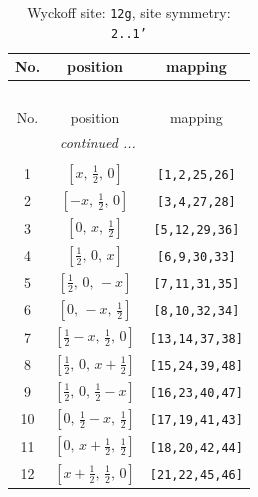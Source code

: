 \documentclass[fleqn,8pt]{jsarticle}
\begin{document}
\begin{longtable}{ccc}
\caption{Wyckoff site: {\tt 12g}, site symmetry: {\tt 2..1'}}
 \\
 \hline \hline
No. & position & mapping \\ \hline \endfirsthead

\multicolumn{2}{l}{\tablename\ \thetable{}} \\
 \hline \hline
No. & position & mapping \\ \hline \endhead

 \hline \hline
\multicolumn{2}{r}{\footnotesize\it continued ...} \\ \endfoot

 \hline \hline
\multicolumn{2}{r}{} \\ \endlastfoot

1 & $\left[ x,\, \frac{1}{2},\, 0 \right]$ & {\tt [1,2,25,26]} \\ \hline
2 & $\left[ - x,\, \frac{1}{2},\, 0 \right]$ & {\tt [3,4,27,28]} \\ \hline
3 & $\left[ 0,\, x,\, \frac{1}{2} \right]$ & {\tt [5,12,29,36]} \\ \hline
4 & $\left[ \frac{1}{2},\, 0,\, x \right]$ & {\tt [6,9,30,33]} \\ \hline
5 & $\left[ \frac{1}{2},\, 0,\, - x \right]$ & {\tt [7,11,31,35]} \\ \hline
6 & $\left[ 0,\, - x,\, \frac{1}{2} \right]$ & {\tt [8,10,32,34]} \\ \hline
7 & $\left[ \frac{1}{2} - x,\, \frac{1}{2},\, 0 \right]$ & {\tt [13,14,37,38]} \\ \hline
8 & $\left[ \frac{1}{2},\, 0,\, x + \frac{1}{2} \right]$ & {\tt [15,24,39,48]} \\ \hline
9 & $\left[ \frac{1}{2},\, 0,\, \frac{1}{2} - x \right]$ & {\tt [16,23,40,47]} \\ \hline
10 & $\left[ 0,\, \frac{1}{2} - x,\, \frac{1}{2} \right]$ & {\tt [17,19,41,43]} \\ \hline
11 & $\left[ 0,\, x + \frac{1}{2},\, \frac{1}{2} \right]$ & {\tt [18,20,42,44]} \\ \hline
12 & $\left[ x + \frac{1}{2},\, \frac{1}{2},\, 0 \right]$ & {\tt [21,22,45,46]} \\
\end{longtable}
\renewcommand{\arraystretch}{1.2}
\end{document}
